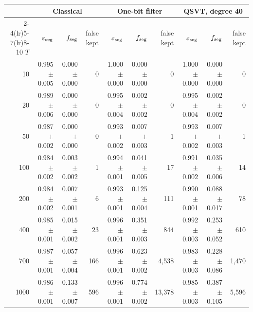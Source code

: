 \begin{tabular}{rrrrrrrrrr}
\toprule
 & \multicolumn{3}{c}{Classical} & \multicolumn{3}{c}{One-bit filter} & \multicolumn{3}{c}{QSVT, degree 40}\\
\cmidrule(lr){2-4}\cmidrule(lr){5-7}\cmidrule(lr){8-10}
$T$ & $\varepsilon_{\rm seg}$ & $f_{\rm seg}$ & false kept & $\varepsilon_{\rm seg}$ & $f_{\rm seg}$ & false kept & $\varepsilon_{\rm seg}$ & $f_{\rm seg}$ & false kept\\\midrule
10 & 0.995 $\pm$ 0.005 & 0.000 $\pm$ 0.000 & 0 & 1.000 $\pm$ 0.000 & 0.000 $\pm$ 0.000 & 0 & 1.000 $\pm$ 0.000 & 0.000 $\pm$ 0.000 & 0\\
20 & 0.989 $\pm$ 0.006 & 0.000 $\pm$ 0.000 & 0 & 0.995 $\pm$ 0.004 & 0.002 $\pm$ 0.002 & 0 & 0.995 $\pm$ 0.004 & 0.002 $\pm$ 0.002 & 0\\
50 & 0.987 $\pm$ 0.002 & 0.000 $\pm$ 0.000 & 0 & 0.993 $\pm$ 0.002 & 0.007 $\pm$ 0.003 & 1 & 0.993 $\pm$ 0.002 & 0.007 $\pm$ 0.003 & 1\\
100 & 0.984 $\pm$ 0.002 & 0.003 $\pm$ 0.002 & 1 & 0.994 $\pm$ 0.001 & 0.041 $\pm$ 0.005 & 17 & 0.991 $\pm$ 0.002 & 0.035 $\pm$ 0.006 & 14\\
200 & 0.984 $\pm$ 0.002 & 0.007 $\pm$ 0.001 & 6 & 0.993 $\pm$ 0.001 & 0.125 $\pm$ 0.004 & 111 & 0.990 $\pm$ 0.001 & 0.088 $\pm$ 0.017 & 78\\
400 & 0.985 $\pm$ 0.001 & 0.015 $\pm$ 0.002 & 23 & 0.996 $\pm$ 0.001 & 0.351 $\pm$ 0.003 & 844 & 0.992 $\pm$ 0.003 & 0.253 $\pm$ 0.052 & 610\\
700 & 0.987 $\pm$ 0.001 & 0.057 $\pm$ 0.004 & 166 & 0.996 $\pm$ 0.001 & 0.623 $\pm$ 0.002 & 4{,}538 & 0.983 $\pm$ 0.003 & 0.228 $\pm$ 0.086 & 1{,}470\\
1000 & 0.986 $\pm$ 0.001 & 0.133 $\pm$ 0.007 & 596 & 0.996 $\pm$ 0.001 & 0.774 $\pm$ 0.002 & 13{,}378 & 0.985 $\pm$ 0.003 & 0.387 $\pm$ 0.105 & 5{,}596\\
\bottomrule
\end{tabular}
